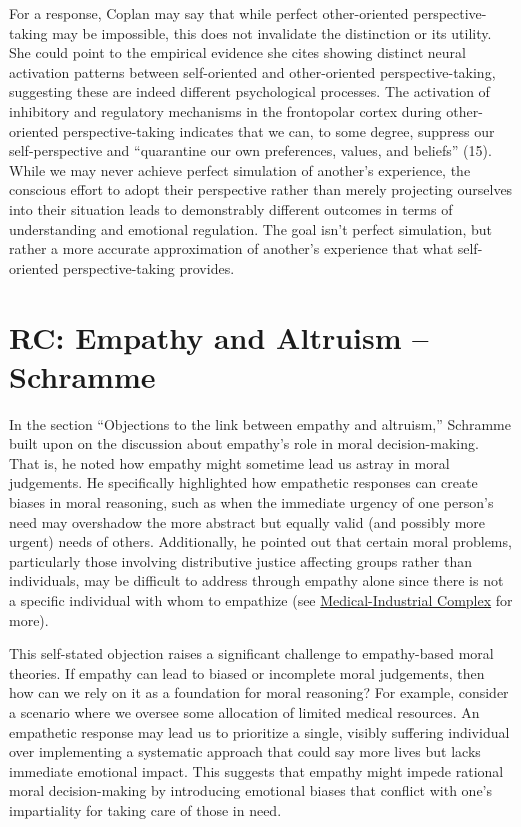\documentclass[11pt]{article}
\begin{document}
For a response, Coplan may say that while perfect other-oriented perspective-taking may be impossible, this does not invalidate the distinction or its utility. She could point to the empirical evidence she cites showing distinct neural activation patterns between self-oriented and other-oriented perspective-taking, suggesting these are indeed different psychological processes. The activation of inhibitory and regulatory mechanisms in the frontopolar cortex during other-oriented perspective-taking indicates that we can, to some degree, suppress our self-perspective and ``quarantine our own preferences, values, and beliefs'' (15). While we may never achieve perfect simulation of another's experience, the conscious effort to adopt their perspective rather than merely projecting ourselves into their situation leads to demonstrably different outcomes in terms of understanding and emotional regulation. The goal isn't perfect simulation, but rather a more accurate approximation of another's experience that what self-oriented perspective-taking provides. 

\section{RC: Empathy and Altruism -- Schramme}

In the section “Objections to the link between empathy and altruism,” Schramme built upon on the discussion about empathy's role in moral decision-making. That is, he noted how empathy might sometime lead us astray in moral judgements.  He specifically highlighted how empathetic responses can create biases in moral reasoning, such as when the immediate urgency of one person's need may overshadow the more abstract but equally valid (and possibly more urgent) needs of others. Additionally, he pointed out that certain moral problems, particularly those involving distributive justice affecting groups rather than individuals, may be difficult to address through empathy alone since there is not a specific individual with whom to empathize (see \href{https://en.wikipedia.org/wiki/Medical\%E2\%80\%93industrial_complex}{Medical-Industrial Complex} for more).

This self-stated objection raises a significant challenge to empathy-based moral theories. If empathy can lead to biased or incomplete moral judgements, then how can we rely on it as a foundation for moral reasoning? For example, consider a scenario where we oversee some allocation of limited medical resources. An empathetic response may lead us to prioritize a single, visibly suffering individual over implementing a systematic approach that could say more lives but lacks immediate emotional impact. This suggests that empathy might impede rational moral decision-making by introducing emotional biases that conflict with one's impartiality for taking care of those in need.  
\end{document}
